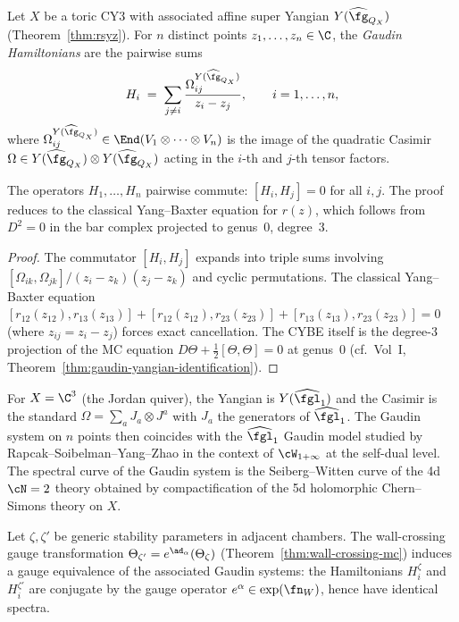 \begin{construction}
\label{constr:toric-gaudin}
Let $X$ be a toric CY3 with associated affine super Yangian
$Y(\widehat{\fg}_{Q_X})$ (Theorem~\ref{thm:rsyz}). For $n$ distinct
points $z_1, \ldots, z_n \in \C$, the \emph{Gaudin Hamiltonians} are
the pairwise sums
\[
 H_i \;=\; \sum_{j \neq i} \frac{\Omega_{ij}^{Y(\widehat{\fg}_{Q_X})}}{z_i - z_j},
 \qquad i = 1, \ldots, n,
\]
where $\Omega_{ij}^{Y(\widehat{\fg}_{Q_X})} \in
\End(V_1 \otimes \cdots \otimes V_n)$ is the image of the quadratic
Casimir $\Omega \in Y(\widehat{\fg}_{Q_X}) \otimes
Y(\widehat{\fg}_{Q_X})$ acting in the $i$-th and $j$-th tensor factors.
\end{construction}

\begin{proposition}
\label{prop:toric-gaudin-commute}
The operators $H_1, \ldots, H_n$ pairwise commute:
$[H_i, H_j] = 0$ for all $i, j$. The proof reduces to the
classical Yang--Baxter equation for $r(z)$, which follows from
$D^2 = 0$ in the bar complex projected to genus~$0$, degree~$3$.
\end{proposition}

\begin{proof}
The commutator $[H_i, H_j]$ expands into triple sums involving
$[\Omega_{ik}, \Omega_{jk}]/(z_i - z_k)(z_j - z_k)$ and cyclic
permutations. The classical Yang--Baxter equation
$[r_{12}(z_{12}), r_{13}(z_{13})] + [r_{12}(z_{12}), r_{23}(z_{23})]
+ [r_{13}(z_{13}), r_{23}(z_{23})] = 0$
(where $z_{ij} = z_i - z_j$) forces exact cancellation. The CYBE
itself is the degree-$3$ projection of the MC equation
$D\Theta + \frac{1}{2}[\Theta, \Theta] = 0$ at genus~$0$
(cf.\ Vol~I, Theorem~\ref{thm:gaudin-yangian-identification}).
\end{proof}

For $X = \C^3$ (the Jordan quiver), the Yangian is
$Y(\widehat{\fgl}_1)$ and the Casimir is the standard
$\Omega = \sum_a J_a \otimes J^a$ with $J_a$ the
generators of $\widehat{\fgl}_1$. The Gaudin system on
$n$ points then coincides with the $\widehat{\fgl}_1$
Gaudin model studied by Rapcak--Soibelman--Yang--Zhao
in the context of $\cW_{1+\infty}$ at the self-dual level.
The spectral curve of the Gaudin system is the
Seiberg--Witten curve of the 4d $\cN = 2$ theory
obtained by compactification of the 5d holomorphic
Chern--Simons theory on $X$.

\begin{proposition}
\label{prop:wall-crossing-gaudin}
Let $\zeta, \zeta'$ be generic stability parameters in adjacent
chambers. The wall-crossing gauge transformation
$\Theta_{\zeta'} = e^{\ad_\alpha}(\Theta_\zeta)$
(Theorem~\ref{thm:wall-crossing-mc}) induces a gauge equivalence
of the associated Gaudin systems: the Hamiltonians $H_i^\zeta$ and
$H_i^{\zeta'}$ are conjugate by the gauge operator
$e^{\alpha} \in \exp(\fn_W)$, hence have identical spectra.
\end{proposition}

